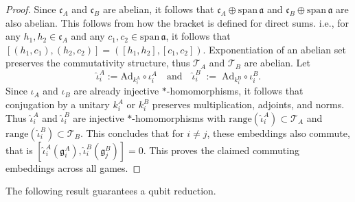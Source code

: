 \documentclass{article}
\begin{document}
    \begin{proof}
        Since $\mathfrak{c}_A$ and $\mathfrak{c}_B$ are abelian, it follows that $\mathfrak{c}_A\oplus \mathrm{span}\,\mathfrak{a}$ and $\mathfrak{c}_B\oplus \mathrm{span}\,\mathfrak{a}$ are also abelian. This follows from how the bracket is defined for direct sums. i.e., for any $h_1,h_2\in \mathfrak{c}_A$ and any $c_1,c_2\in \mathrm{span}\,\mathfrak{a}$, it follows that $[(h_1,c_1),(h_2,c_2)]=\left([h_1,h_2],[c_1,c_2]\right)$. Exponentiation of an abelian set preserves the commutativity structure, thus $\mathcal{T}_A$ and $\mathcal{T}_B$ are abelian. Let 
        \begin{equation}
            \widehat\iota_i^A := \mathrm{Ad}_{k_i^{\mathrm A}}\circ \iota_i^A \quad\text{and}\quad \widehat\iota_i^B \;:=\; \mathrm{Ad}_{k_i^{\mathrm B}}\circ \iota_i^B.
        \end{equation}
        Since $\iota_A$ and $\iota_B$ are already injective $*$-homomorphisms, it follows that conjugation by a unitary $k_i^A$ or $k_i^B$ preserves multiplication, adjoints, and norms. Thus $\widehat\iota_i^A$ and $\widehat\iota_i^B$ are injective $*$-homomorphisms with $\mathrm{range}(\widehat\iota_i^A)\subset\mathcal{T}_A$ and $\mathrm{range}(\widehat\iota_i^B)\subset\mathcal{T}_B$. This concludes that for $i\neq j$, these embeddings also commute, that is $[\widehat\iota_i^A(\mathfrak{g}^A_i),\widehat\iota_i^B(\mathfrak{g}^B_j)]=0$. This proves the claimed commuting embeddings across all games.
    \end{proof}

    The following result guarantees a qubit reduction.  
\end{document}
